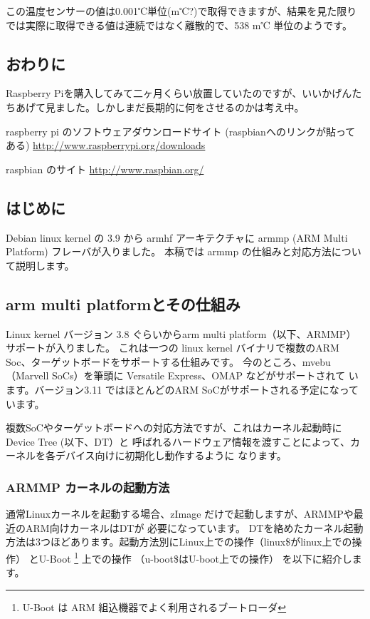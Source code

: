 \documentclass[mingoth,a4paper]{jsarticle}
\begin{document}
この温度センサーの値は0.001℃単位(m℃?)で取得できますが、結果を見た限り
では実際に取得できる値は連続ではなく離散的で、538 m℃ 単位のようです。

\subsection{おわりに}

Raspberry Piを購入してみて二ヶ月くらい放置していたのですが、いいかげんた
ちあげて見ました。しかしまだ長期的に何をさせるのかは考え中。

\begin{thebibliography}{}
  raspberry pi のソフトウェアダウンロードサイト (raspbianへのリンクが貼ってある)
\url{http://www.raspberrypi.org/downloads}

 raspbian のサイト \url{http://www.raspbian.org/}
\end{thebibliography}


\subsection{はじめに}
Debian linux kernel の 3.9 から armhf アーキテクチャに armmp (ARM Multi Platform)
フレーバが入りました。
本稿では armmp の仕組みと対応方法について説明します。

\subsection{arm multi platformとその仕組み}

Linux kernel バージョン 3.8 ぐらいからarm multi platform（以下、ARMMP） サポートが入りました。
これは一つの linux kernel バイナリで複数のARM Soc、ターゲットボードをサポートする仕組みです。
今のところ、mvebu （Marvell SoCs）を筆頭に Versatile Express、OMAP などがサポートされて
います。バージョン3.11 ではほとんどのARM SoCがサポートされる予定になっています。

複数SoCやターゲットボードへの対応方法ですが、これはカーネル起動時にDevice Tree (以下、DT）と
呼ばれるハードウェア情報を渡すことによって、カーネルを各デバイス向けに初期化し動作するように
なります。

\subsubsection{ARMMP カーネルの起動方法}
通常Linuxカーネルを起動する場合、zImage だけで起動しますが、ARMMPや最近のARM向けカーネルはDTが
必要になっています。
DTを絡めたカーネル起動方法は3つほどあります。起動方法別にLinux上での操作（linux\$がlinux上での操作）
とU-Boot
\footnote{U-Boot は ARM 組込機器でよく利用されるブートローダ}
上での操作
（u-boot\$はU-boot上での操作）
を以下に紹介します。
\end{document}
